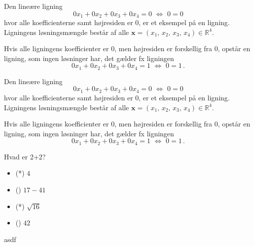 \begin{example}\label{TN2.2}

Den lineære ligning
\begin{equation}
0x_1+0x_2+0x_3+0x_4=0\,\,\Leftrightarrow\,\,0=0
\end{equation}
hvor alle koefficienterne samt højresiden er 0, er et eksempel på en  ligning. Ligningens løsningsmængde består af alle $\mathbf x=(x_1,\,x_2,\,x_3,\,x_4) \in \mathbb R^4$.\bs


Hvis alle ligningens koefficienter er 0, men højresiden er forskellig fra 0, opstår en  ligning, som ingen løsninger har, det gælder fx ligningen
\begin{equation}
0x_1+0x_2+0x_3+0x_4=1\,\,\Leftrightarrow\,\,0=1\,.
\end{equation}

\end{example}




\begin{example}\label{TN2.2}
Den lineære ligning
\begin{equation}
0x_1+0x_2+0x_3+0x_4=0\,\,\Leftrightarrow\,\,0=0
\end{equation}
hvor alle koefficienterne samt højresiden er 0, er et eksempel på en  ligning. Ligningens løsningsmængde består af alle $\mathbf x=(x_1,\,x_2,\,x_3,\,x_4) \in \mathbb R^4$.\bs

Hvis alle ligningens koefficienter er 0, men højresiden er forskellig fra 0, opstår en  ligning, som ingen løsninger har, det gælder fx ligningen
\begin{equation}
0x_1+0x_2+0x_3+0x_4=1\,\,\Leftrightarrow\,\,0=1\,.
\end{equation}

\end{example}

\begin{exercise}
	\begin{question}
		Hvad er 2+2?
		\begin{itemize}
			\item (*) $4$
			\item () $17 - 41$
			\item (*) $\sqrt{16}$
			\item () $42$
		\end{itemize}
	\end{question}
\end{exercise}


\begin{summary}


asdf
\end{summary}





